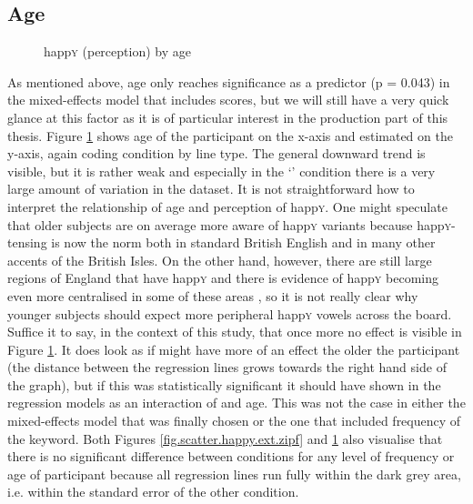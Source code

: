 \subsection{Age}
\label{sec.perc_res.happy.age}

\begin{figure}[h]
	\centering
		\resizebox{.49\linewidth}{!}{} 
	\caption{happ\textsc{y} (perception) by age}
	\label{fig.scatter.happy.ext.age}
\end{figure}

As mentioned above, age only reaches significance as a predictor (p = 0.043) in the mixed-effects model that includes  scores, but we will still have a very quick glance at this factor as it is of particular interest in the production part of this thesis.
Figure \ref{fig.scatter.happy.ext.age} shows age of the participant on the x-axis and estimated  on the y-axis, again coding  condition by line type.
The general downward trend is visible, but it is rather weak and especially in the `' condition there is a very large amount of variation in the dataset.
It is not straightforward how to interpret the relationship of age and perception of happ\textsc{y}.
One might speculate that older subjects are on average more aware of  happ\textsc{y} variants because happ\textsc{y}-tensing is now the norm both in standard British English and in many other accents of the British Isles.
On the other hand, however, there are still large regions of England that have  happ\textsc{y} and there is evidence of happ\textsc{y} becoming even more centralised in some of these areas \parencite[cf.][]{flynn2010}, so it is not really clear why younger subjects should expect more peripheral happ\textsc{y} vowels across the board.
Suffice it to say, in the context of this study, that once more no  effect is visible in Figure \ref{fig.scatter.happy.ext.age}.
It does look as if  might have more of an effect the older the participant (the distance between the regression lines grows towards the right hand side of the graph), but if this was statistically significant it should have shown in the regression models as an interaction of  and age.
This was not the case in either the mixed-effects model that was finally chosen or the one that included frequency of the keyword.
Both Figures \ref{fig.scatter.happy.ext.zipf} and \ref{fig.scatter.happy.ext.age} also visualise that there is no significant difference between  conditions for any level of frequency or age of participant because all regression lines run fully within the dark grey area, i.e. within the standard error of the other condition.


